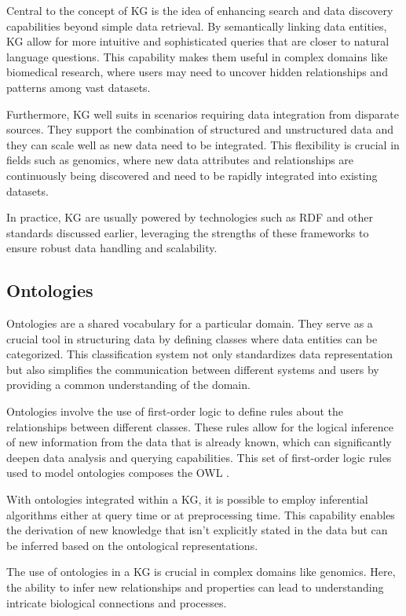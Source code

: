 Central to the concept of \ac{KG} is the idea of enhancing search and data discovery capabilities beyond simple data retrieval. By semantically linking data entities, \ac{KG} allow for more intuitive and sophisticated queries that are closer to natural language questions. This capability makes them useful in complex domains like biomedical research, where users may need to uncover hidden relationships and patterns among vast datasets.

Furthermore, \ac{KG} well suits in scenarios requiring data integration from disparate sources. They support the combination of structured and unstructured data and they can scale well as new data need to be integrated. This flexibility is crucial in fields such as genomics, where new data attributes and relationships are continuously being discovered and need to be rapidly integrated into existing datasets.

In practice, \ac{KG} are usually powered by technologies such as \ac{RDF} and other standards discussed earlier, leveraging the strengths of these frameworks to ensure robust data handling and scalability.

\subsection{Ontologies}
Ontologies are a shared vocabulary for a particular domain. They serve as a crucial tool in structuring data by defining classes where data entities can be categorized. This classification system not only standardizes data representation but also simplifies the communication between different systems and users by providing a common understanding of the domain.

Ontologies involve the use of first-order logic to define rules about the relationships between different classes. These rules allow for the logical inference of new information from the data that is already known, which can significantly deepen data analysis and querying capabilities. This set of first-order logic rules used to model ontologies composes the \ac{OWL} \cite{mcguinness2004owl}.

With ontologies integrated within a \ac{KG}, it is possible to employ inferential algorithms either at query time or at preprocessing time. This capability enables the derivation of new knowledge that isn't explicitly stated in the data but can be inferred based on the ontological representations.

The use of ontologies in a \ac{KG} is crucial in complex domains like genomics. Here, the ability to infer new relationships and properties can lead to understanding intricate biological connections and processes.

